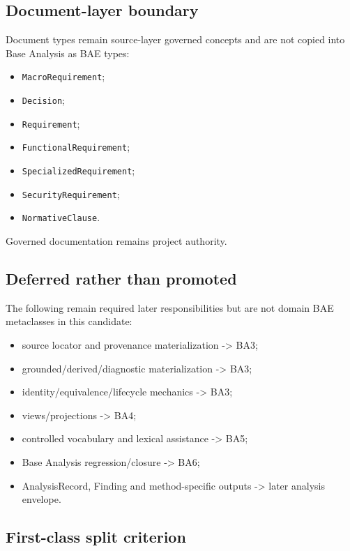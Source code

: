 \documentclass[
  10pt,
]{article}
\providecommand{\tightlist}{%
  \setlength{\itemsep}{0pt}\setlength{\parskip}{0pt}}
\begin{document}
\subsection{Document-layer boundary}\label{document-layer-boundary}

Document types remain source-layer governed concepts and are not copied
into Base Analysis as BAE types:

\begin{itemize}
\tightlist
\item
  \texttt{MacroRequirement};
\item
  \texttt{Decision};
\item
  \texttt{Requirement};
\item
  \texttt{FunctionalRequirement};
\item
  \texttt{SpecializedRequirement};
\item
  \texttt{SecurityRequirement};
\item
  \texttt{NormativeClause}.
\end{itemize}

Governed documentation remains project authority.

\subsection{Deferred rather than
promoted}\label{deferred-rather-than-promoted}

The following remain required later responsibilities but are not domain
BAE metaclasses in this candidate:

\begin{itemize}
\tightlist
\item
  source locator and provenance materialization -\textgreater{} BA3;
\item
  grounded/derived/diagnostic materialization -\textgreater{} BA3;
\item
  identity/equivalence/lifecycle mechanics -\textgreater{} BA3;
\item
  views/projections -\textgreater{} BA4;
\item
  controlled vocabulary and lexical assistance -\textgreater{} BA5;
\item
  Base Analysis regression/closure -\textgreater{} BA6;
\item
  AnalysisRecord, Finding and method-specific outputs -\textgreater{}
  later analysis envelope.
\end{itemize}

\subsection{First-class split
criterion}\label{first-class-split-criterion}
\end{document}
